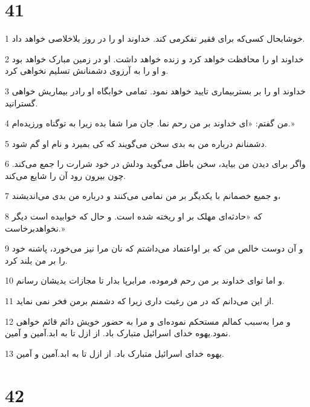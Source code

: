 \chapter{41}

\par 1 خوشابحال کسی‌که برای فقیر تفکرمی کند. خداوند او را در روز بلاخلاصی خواهد داد.
\par 2 خداوند او را محافظت خواهد کرد و زنده خواهد داشت. او در زمین مبارک خواهد بود و او را به آرزوی دشمنانش تسلیم نخواهی کرد.
\par 3 خداوند او را بر بستربیماری تایید خواهد نمود. تمامی خوابگاه او رادر بیماریش خواهی گسترانید.
\par 4 من گفتم: «ای خداوند بر من رحم نما. جان مرا شفا بده زیرا به توگناه ورزیده‌ام.»
\par 5 دشمنانم درباره من به بدی سخن می‌گویند که کی بمیرد و نام او گم شود.
\par 6 واگر برای دیدن من بیاید، سخن باطل می‌گوید ودلش در خود شرارت را جمع می‌کند. چون بیرون رود آن را شایع می‌کند.
\par 7 و جمیع خصمانم با یکدیگر بر من نمامی می‌کنند و درباره من بدی می‌اندیشند،
\par 8 که «حادثه‌ای مهلک بر او ریخته شده است. و حال که خوابیده است دیگر نخواهدبرخاست.»
\par 9 و آن دوست خالص من که بر اواعتماد می‌داشتم که نان مرا نیز می‌خورد، پاشنه خود را بر من بلند کرد.
\par 10 و اما تو‌ای خداوند بر من رحم فرموده، مرابرپا بدار تا مجازات بدیشان رسانم.
\par 11 از این می‌دانم که در من رغبت داری زیرا که دشمنم برمن فخر نمی نماید.
\par 12 و مرا به‌سبب کمالم مستحکم نموده‌ای و مرا به حضور خویش دائم قائم خواهی نمود.یهوه خدای اسرائیل متبارک باد. از ازل تا به ابد.آمین و آمین.
\par 13 یهوه خدای اسرائیل متبارک باد. از ازل تا به ابد.آمین و آمین.
 
\chapter{42}

